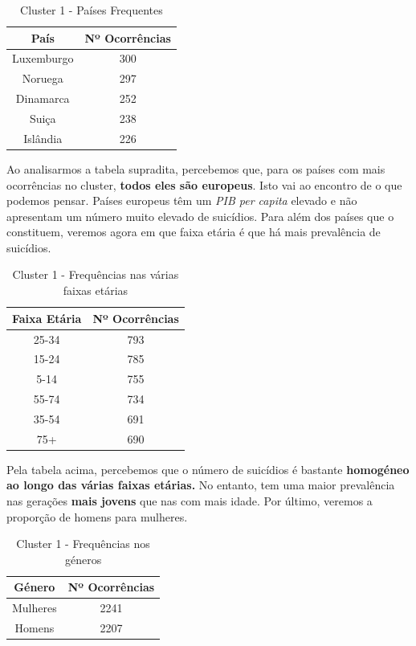 \documentclass[a4paper,12pt]{article}
\begin{document}
\begin{table}[H]
	\centering
	\caption{Cluster 1 - Países Frequentes}
	\begin{tabular}{|c|c|} 
		\hline
		\rowcolor[rgb]{0.678,1,0.851} País & Nº Ocorrências  \\ 
		\hline
		Luxemburgo                         & 300             \\ 
		\hline
		Noruega                            & 297             \\ 
		\hline
		Dinamarca                          & 252             \\ 
		\hline
		Suiça                              & 238             \\ 
		\hline
		Islândia                           & 226             \\
		\hline
	\end{tabular}
\end{table}
Ao analisarmos a tabela supradita, percebemos que, para os países com mais ocorrências no cluster, \textbf{todos eles são europeus}. Isto vai ao encontro de o que podemos pensar. Países europeus têm um \textit{PIB per capita} elevado e não apresentam um número muito elevado de suicídios.
Para além dos países que o constituem, veremos agora em que faixa etária é que há mais prevalência de suicídios.

\begin{table}[H]
	\centering
	\caption{Cluster 1 - Frequências nas várias faixas etárias}
	\begin{tabular}{|c|c|} 
		\hline
		\rowcolor[rgb]{0.678,1,0.851} Faixa Etária & Nº Ocorrências  \\ 
		\hline
		25-34        & 793             \\ 
		\hline
		15-24        & 785             \\ 
		\hline
		5-14         & 755             \\ 
		\hline
		55-74        & 734             \\ 
		\hline
		35-54        & 691             \\ 
		\hline
		75+          & 690             \\
		\hline
	\end{tabular}
\end{table}

Pela tabela acima, percebemos que o número de suicídios é bastante \textbf{homogéneo ao longo das várias faixas etárias.} No entanto, tem uma maior prevalência nas gerações \textbf{mais jovens} que nas com mais idade.
Por último, veremos a proporção de homens para mulheres.
\begin{table}[H]
	\centering
	\caption{Cluster 1 - Frequências nos géneros}
	\begin{tabular}{|c|c|} 
		\hline
		\rowcolor[rgb]{0.2,0.7,0.6} Género   & Nº Ocorrências  \\ 
		\hline
		Mulheres & 2241            \\ 
		\hline
		Homens   & 2207            \\
		\hline
	\end{tabular}
\end{table}
\end{document}
